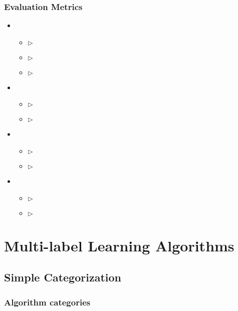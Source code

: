 \documentclass{beamer}
\begin{document}
\begin{frame}
\frametitle{Evaluation Metrics}
\begin{itemize}
\item 

\begin{itemize}
\item [] $\rhd$ 
\item [] $\rhd$ 
\item [] $\rhd$ 
\end{itemize}

\item 

\begin{itemize}
\item [] $\rhd$ 
\item [] $\rhd$ 
\end{itemize}

\item 
\begin{itemize}
\item [] $\rhd$ 
\item [] $\rhd$
\end{itemize}

\item 
\begin{itemize}
\item [] $\rhd$ 
\item [] $\rhd$
\end{itemize}
\end{itemize}

\end{frame}



\section{Multi-label Learning Algorithms}


\subsection{Simple Categorization}

\begin{frame}
\frametitle{Algorithm categories}

\end{frame}
\end{document}
